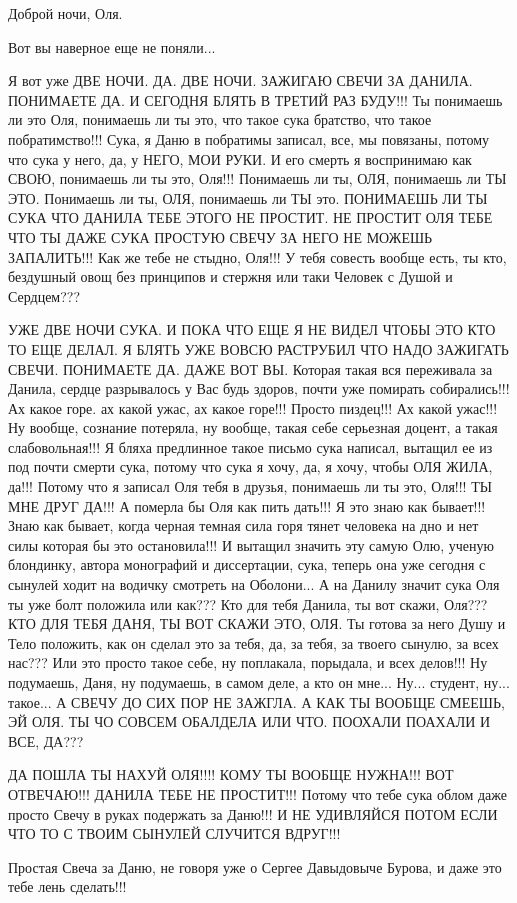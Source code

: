 Доброй ночи, Оля.

Вот вы наверное еще не поняли...

Я вот уже ДВЕ НОЧИ. ДА. ДВЕ НОЧИ. ЗАЖИГАЮ СВЕЧИ ЗА ДАНИЛА. ПОНИМАЕТЕ ДА.  И
СЕГОДНЯ БЛЯТЬ В ТРЕТИЙ РАЗ БУДУ!!! Ты понимаешь ли это Оля, понимаешь ли ты
это, что такое сука братство, что такое побратимство!!! Сука, я Даню в
побратимы записал, все, мы повязаны, потому что сука у него, да, у НЕГО, МОИ
РУКИ. И его смерть я воспринимаю как СВОЮ, понимаешь ли ты это, Оля!!!
Понимаешь ли ты, ОЛЯ, понимаешь ли ТЫ ЭТО. Понимаешь ли ты, ОЛЯ, понимаешь ли
ТЫ это. ПОНИМАЕШЬ ЛИ ТЫ СУКА ЧТО ДАНИЛА ТЕБЕ ЭТОГО НЕ ПРОСТИТ. НЕ ПРОСТИТ ОЛЯ
ТЕБЕ ЧТО ТЫ ДАЖЕ СУКА ПРОСТУЮ СВЕЧУ ЗА НЕГО НЕ МОЖЕШЬ ЗАПАЛИТЬ!!! Как же тебе
не стыдно, Оля!!!  У тебя совесть вообще есть, ты кто, бездушный овощ без
принципов и стержня или таки Человек с Душой и Сердцем???

УЖЕ ДВЕ НОЧИ СУКА. И ПОКА ЧТО ЕЩЕ Я НЕ ВИДЕЛ ЧТОБЫ ЭТО КТО ТО ЕЩЕ ДЕЛАЛ. Я
БЛЯТЬ УЖЕ ВОВСЮ РАСТРУБИЛ ЧТО НАДО ЗАЖИГАТЬ СВЕЧИ. ПОНИМАЕТЕ ДА. ДАЖЕ ВОТ ВЫ.
Которая такая вся переживала за Данила, сердце разрывалось у Вас будь здоров,
почти уже помирать собирались!!!  Ах какое горе. ах какой ужас, ах какое
горе!!! Просто пиздец!!!  Ах какой ужас!!! Ну вообще, сознание потеряла, ну
вообще, такая себе серьезная доцент, а такая слабовольная!!!  Я бляха
предлинное такое письмо сука написал, вытащил ее из под почти смерти сука,
потому что сука я хочу, да, я хочу, чтобы ОЛЯ ЖИЛА, да!!! Потому что я записал
Оля тебя в друзья, понимаешь ли ты это, Оля!!! ТЫ МНЕ ДРУГ ДА!!!  А померла бы
Оля как пить дать!!!  Я это знаю как бывает!!! Знаю как бывает, когда черная
темная сила горя тянет человека на дно и нет силы которая бы это остановила!!!
И вытащил значить эту самую Олю, ученую блондинку, автора монографий и
диссертации, сука, теперь она уже сегодня с сынулей ходит на водичку смотреть
на Оболони... А на Данилу значит сука Оля ты уже болт положила или как???  Кто
для тебя Данила, ты вот скажи, Оля??? КТО ДЛЯ ТЕБЯ ДАНЯ, ТЫ ВОТ СКАЖИ ЭТО, ОЛЯ.
Ты готова за него Душу и Тело положить, как он сделал это за тебя, да, за тебя,
за твоего сынулю, за всех нас??? Или это просто такое себе, ну поплакала,
порыдала, и всех делов!!! Ну подумаешь, Даня, ну подумаешь, в самом деле, а кто
он мне...  Ну... студент, ну... такое...  А СВЕЧУ ДО СИХ ПОР НЕ ЗАЖГЛА. А КАК
ТЫ ВООБЩЕ СМЕЕШЬ, ЭЙ ОЛЯ. ТЫ ЧО СОВСЕМ ОБАЛДЕЛА ИЛИ ЧТО. ПООХАЛИ ПОАХАЛИ И ВСЕ,
ДА??? 

ДА ПОШЛА ТЫ НАХУЙ ОЛЯ!!!! КОМУ ТЫ ВООБЩЕ НУЖНА!!! ВОТ ОТВЕЧАЮ!!! ДАНИЛА ТЕБЕ НЕ ПРОСТИТ!!!
Потому что тебе сука облом даже просто Свечу в руках подержать за Даню!!!
И НЕ УДИВЛЯЙСЯ ПОТОМ ЕСЛИ ЧТО ТО С ТВОИМ СЫНУЛЕЙ СЛУЧИТСЯ ВДРУГ!!!

Простая Свеча за Даню, не говоря уже о Сергее Давыдовыче Бурова, 
и даже это тебе лень сделать!!!
